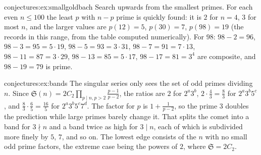 \begin{solution}{conjectures:ex:smallgoldbach}
\idea Search upwards from the smallest primes.
\writeup For each even $n\le100$ the least $p$ with $n-p$ prime is quickly found: it is $2$ for $n=4$, $3$ for most $n$, and the larger values are
$p(12)=5$, $p(30)=7$, $p(98)=19$ (the records in this range, from the table computed numerically). For $98$: $98-2=96$, $98-3=95=5\cdot19$,
$98-5=93=3\cdot31$, $98-7=91=7\cdot13$, $98-11=87=3\cdot29$, $98-13=85=5\cdot17$, $98-17=81=3^4$ are composite, and $98-19=79$ is prime.
\end{solution}

\begin{solution}{conjectures:ex:bands}
\idea The singular series only sees the set of odd primes dividing $n$.
\writeup Since $\mathfrak S(n)=2C_2\prod_{p\mid n,p>2}\frac{p-1}{p-2}$, the ratios are $2$ for $2^a3^b$, $2\cdot\frac43=\frac83$ for $2^a3^b5^c$, and
$\frac83\cdot\frac65=\frac{16}5$ for $2^a3^b5^c7^d$. The factor for $p$ is $1+\frac1{p-2}$, so the prime $3$ doubles the prediction while large primes barely
change it. That splits the comet into a band for $3\nmid n$ and a band twice as high for $3\mid n$, each of which is subdivided more finely by $5$, $7$,
and so on. The lowest edge consists of the $n$ with no small odd prime factors, the extreme case being the powers of $2$, where $\mathfrak S=2C_2$.
\end{solution}

